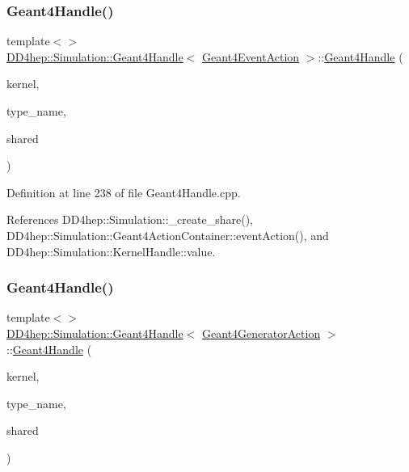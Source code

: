 \subsubsection{\texorpdfstring{Geant4\+Handle()}{Geant4Handle()}\hspace{0.1cm}{\footnotesize\ttfamily [11/20]}}
{\footnotesize\ttfamily template$<$$>$ \\
\hyperlink{class_d_d4hep_1_1_simulation_1_1_geant4_handle}{D\+D4hep\+::\+Simulation\+::\+Geant4\+Handle}$<$ \hyperlink{class_d_d4hep_1_1_simulation_1_1_geant4_event_action}{Geant4\+Event\+Action} $>$\+::\hyperlink{class_d_d4hep_1_1_simulation_1_1_geant4_handle}{Geant4\+Handle} (\begin{DoxyParamCaption}\item[{\hyperlink{class_d_d4hep_1_1_simulation_1_1_geant4_kernel}{Geant4\+Kernel} \&}]{kernel,  }\item[{const char $\ast$}]{type\+\_\+name,  }\item[{bool}]{shared }\end{DoxyParamCaption})}



Definition at line 238 of file Geant4\+Handle.\+cpp.



References D\+D4hep\+::\+Simulation\+::\+\_\+create\+\_\+share(), D\+D4hep\+::\+Simulation\+::\+Geant4\+Action\+Container\+::event\+Action(), and D\+D4hep\+::\+Simulation\+::\+Kernel\+Handle\+::value.

\hypertarget{class_d_d4hep_1_1_simulation_1_1_geant4_handle_a34f1cab445068db4228bb0c6c6450d84}{}\label{class_d_d4hep_1_1_simulation_1_1_geant4_handle_a34f1cab445068db4228bb0c6c6450d84} 
\subsubsection{\texorpdfstring{Geant4\+Handle()}{Geant4Handle()}\hspace{0.1cm}{\footnotesize\ttfamily [12/20]}}
{\footnotesize\ttfamily template$<$$>$ \\
\hyperlink{class_d_d4hep_1_1_simulation_1_1_geant4_handle}{D\+D4hep\+::\+Simulation\+::\+Geant4\+Handle}$<$ \hyperlink{class_d_d4hep_1_1_simulation_1_1_geant4_generator_action}{Geant4\+Generator\+Action} $>$\+::\hyperlink{class_d_d4hep_1_1_simulation_1_1_geant4_handle}{Geant4\+Handle} (\begin{DoxyParamCaption}\item[{\hyperlink{class_d_d4hep_1_1_simulation_1_1_geant4_kernel}{Geant4\+Kernel} \&}]{kernel,  }\item[{const string \&}]{type\+\_\+name,  }\item[{bool}]{shared }\end{DoxyParamCaption})}



